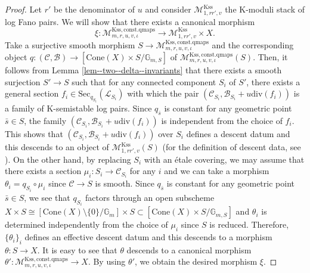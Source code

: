 \documentclass[12pt,twoside]{amsart}
\theoremstyle{definition}
\begin{document}
\begin{proof}
   Let $r'$ be the denominator of $u$ and consider $\mathcal{M}^{\mathrm{Kss}}_{1,rr',v}$ the K-moduli stack of log Fano pairs.
   We will show that there exists a canonical morphism 
   $$\xi\colon \mathcal{M}^{\mathrm{Kss,const.qmaps}}_{m,r,u,v,\iota}\to \mathcal{M}^{\mathrm{Kss}}_{1,rr',v}\times X.$$
   Take a surjective smooth morphism $S\to \mathcal{M}^{\mathrm{Kss,const.qmaps}}_{m,r,u,v,\iota}$ and the corresponding object $q\colon(\mathcal{C},\mathcal{B})\to [\mathrm{Cone}(X)\times S/\mathbb{G}_{m,S}]$ of $\mathcal{M}^{\mathrm{Kss,const.qmaps}}_{m,r,u,v,\iota}(S)$.
   Then, it follows from Lemma \ref{lem--two--delta--invariants} that there exists a smooth surjection $S'\to S$ such that for any connected component $S_i$ of $S'$, there exists a general section $f_i\in\mathrm{Sec}_{q_{S_i}}(\mathscr{L}_{S_i})$ with which the pair $(\mathcal{C}_{S_i},\mathcal{B}_{S_i}+u\mathrm{div}(f_{i}))$ is a family of K-semistable log pairs.
   Since $q_{\bar{s}}$ is constant for any geometric point $\bar{s}\in S$, the family $(\mathcal{C}_{S_i},\mathcal{B}_{S_i}+u\mathrm{div}(f_{i}))$ is independent from the choice of $f_i$.
   This shows that $(\mathcal{C}_{S_i},\mathcal{B}_{S_i}+u\mathrm{div}(f_{i}))$ over $S_i$ defines a descent datum and this descends to an object of $\mathcal{M}^{\mathrm{Kss}}_{1,rr',v}(S)$ (for the definition of descent data, see \cite[Remark 2.10]{HH}). 
   On the other hand, by replacing $S_{i}$ with an \'etale covering, we may assume that there exists a section $\mu_i\colon S_i\to \mathcal{C}_{S_i}$ for any $i$ and we can take a morphism $\theta_i=q_{S_i}\circ \mu_i$ since $\mathcal{C}\to S$ is smooth.
   Since $q_{\bar{s}}$ is constant for any geometric point $\bar{s}\in S$, we see that $q_{S_i}$ factors through an open subscheme $X\times S\cong[\mathrm{Cone}(X)\setminus\{0\}/\mathbb{G}_m]\times S\subset [\mathrm{Cone}(X)\times S/\mathbb{G}_{m,S}]$ and $\theta_i$ is determined independently from the choice of $\mu_i$ since $S$ is reduced.
   Therefore, $\{\theta_i\}_{i}$ defines an effective descent datum and this descends to a morphism $\theta\colon S\to X$. 
   It is easy to see that $\theta$ descends to a canonical morphism $\theta'\colon \mathcal{M}^{\mathrm{Kss,const.qmaps}}_{m,r,u,v,\iota}\to X$.
   By using $\theta'$, we obtain the desired morphism $\xi$. 


\end{proof}
\end{document}
